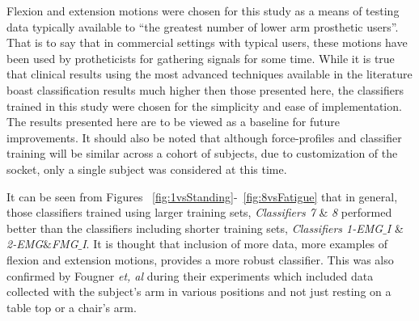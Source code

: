 \documentclass[twocolumn]{sagej}
\begin{document}
Flexion and extension motions were chosen for this study as a means of testing data typically available to ``the greatest number of lower arm prosthetic users''.  That is to say that in commercial settings with typical users, these motions have been used by protheticists for gathering signals for some time.  While it is true that clinical results using the most advanced techniques available in the literature boast classification results much higher then those presented here, the classifiers trained in this study were chosen for the simplicity and ease of implementation.  The results presented here are to be viewed as a baseline for future improvements.  It should also be noted that although force-profiles and classifier training will be similar across a cohort of subjects, due to customization of the socket, only a single subject was considered at this time. \par \noindent
It can be seen from Figures ~\ref{fig:1vsStanding}-~\ref{fig:8vsFatigue} that in general, those classifiers trained using larger training sets, \textit{Classifiers 7} \& \textit{8} performed better than the classifiers including shorter training sets, \textit{Classifiers 1-EMG$\_$I} \& \textit{2-EMG$\&$FMG$\_$I}.  It is thought that inclusion of more data, more examples of flexion and extension motions, provides a more robust classifier.  This was also confirmed by Fougner \textit{et, al} during their experiments which included data collected with the subject's arm in various positions and not just resting on a table top or a chair's arm. \par \noindent
\end{document}
